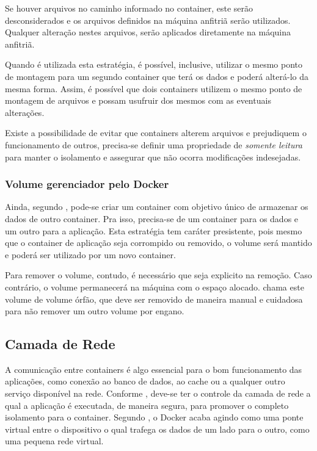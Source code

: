 \documentclass[
	12pt,				%
	openright,			%
	oneside,			%
	a4paper,			%
	chapter=TITLE,		%
	section=TITLE,		%
	english,			%
	french,				%
	spanish,			%
	brazil				%
	]{abntex2}
\begin{document}
Se houver arquivos no caminho informado no container, este serão desconsiderados e os arquivos definidos na máquina anfitriã serão utilizados. Qualquer alteração nestes arquivos, serão aplicados diretamente na máquina anfitriã.

Quando é utilizada esta estratégia, é possível, inclusive, utilizar o mesmo ponto de montagem para um segundo container que terá os dados e poderá alterá-lo da mesma forma. Assim, é possível que dois containers utilizem o mesmo ponto de montagem de arquivos e possam usufruir dos mesmos com as eventuais alterações.

Existe a possibilidade de evitar que containers alterem arquivos e prejudiquem o funcionamento de outros, precisa-se definir uma propriedade de \textit{somente leitura} para manter o isolamento e assegurar que não ocorra modificações indesejadas.

\subsubsection{Volume gerenciador pelo Docker}

Ainda, segundo , pode-se criar um container com objetivo único de armazenar os dados de outro container. Pra isso, precisa-se de um container para os dados e um outro para a aplicação. Esta estratégia tem caráter presistente, pois mesmo que o container de aplicação seja corrompido ou removido, o volume será mantido e poderá ser utilizado por um novo container.

Para remover o volume, contudo, é necessário que seja explicito na remoção. Caso contrário, o volume permanecerá na máquina com o espaço alocado.  chama este volume de volume órfão, que deve ser removido de maneira manual e cuidadosa para não remover um outro volume por engano.

\subsection{Camada de Rede}

A comunicação entre containers é algo essencial para o bom funcionamento das aplicações, como conexão ao banco de dados, ao cache ou a qualquer outro serviço disponível na rede. Conforme , deve-se ter o controle da camada de rede a qual a aplicação é executada, de maneira segura, para promover o completo isolamento para o container. Segundo , o Docker acaba agindo como uma ponte virtual entre o dispositivo o qual trafega os dados de um lado para o outro, como uma pequena rede virtual.
\end{document}
